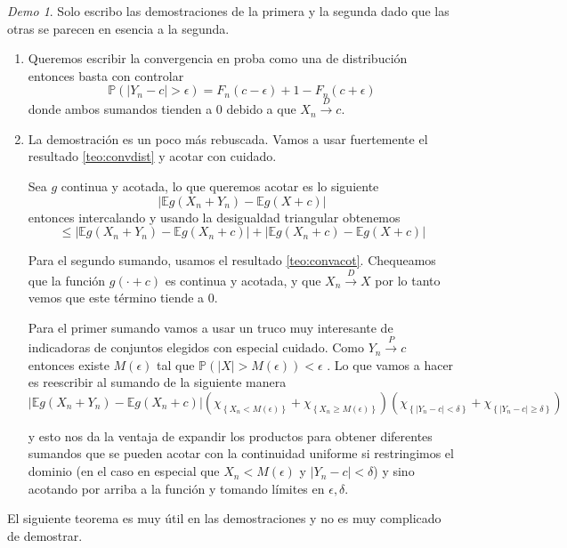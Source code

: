 \documentclass[11pt]{article}
\theoremstyle{plain} %
\theoremstyle{definition}
\theoremstyle{remark}
\newtheorem*{demo}{Demo}
\def\E{\mathbb{E}}
\def\P{\mathbb{P}}
\renewcommand\qed{\ding{110}}
\newcommand{\proba}{\overset{P}{\to}}
\newcommand{\dist}{\overset{D}{\to}}
\begin{document}
\begin{demo}
	Solo escribo las demostraciones de la primera y la segunda dado que las otras se parecen en esencia a la segunda.
	\begin{enumerate}
		\item Queremos escribir la convergencia en proba como una de distribución entonces basta con controlar 
		\[\P(\left| Y_n -c \right| > \epsilon ) = F_n(c - \epsilon) + 1 - F_n(c + \epsilon) \]
		donde ambos sumandos tienden a 0 debido a que $X_n \dist c$.
		
		\item La demostración es un poco más rebuscada. Vamos a usar fuertemente el resultado \ref{teo:convdist} y acotar con cuidado.
		
		Sea $g$ continua y acotada, lo que queremos acotar es lo siguiente
		\[ \left| \E  g(X_n + Y_n) - \E g(X + c)  \right| \]
		entonces intercalando y usando la desigualdad triangular obtenemos 
		\[ \leq \left| \E  g(X_n + Y_n) - \E g(X_n + c)  \right| + \left| \E  g(X_n + c) - \E g(X + c)  \right| \]
		
		Para el segundo sumando, usamos el resultado \ref{teo:convacot}. Chequeamos que la función $g(\cdot + c)$ es continua y acotada, y que $X_n \dist X$ por lo tanto vemos que este término tiende a 0.
		
		Para el primer sumando vamos a usar un truco muy interesante de indicadoras de conjuntos elegidos con especial cuidado. Como $Y_n \proba c$ entonces existe $M(\epsilon)$ tal que $\P\left( \left|X \right| > M(\epsilon) \right) < \epsilon  $ . Lo que vamos a hacer es reescribir al sumando de la siguiente manera
		\[ \left| \E  g(X_n + Y_n) - \E g(X_n + c)  \right| \left( \chi_{\left\lbrace X_n < M(\epsilon) \right\rbrace } + \chi_{\left\lbrace X_n \geq M(\epsilon) \right\rbrace } \right) \left( \chi_{\left\lbrace |Y_n - c| < \delta \right\rbrace } + \chi_{\left\lbrace |Y_n - c| \geq \delta \right\rbrace } \right) \]
		
		y esto nos da la ventaja de expandir los productos para obtener diferentes sumandos que se pueden acotar con la continuidad uniforme si restringimos el dominio (en el caso en especial que $X_n < M(\epsilon)$ y $|Y_n - c| < \delta $) y sino acotando por arriba a la función y tomando límites en $\epsilon, \delta$. \qed
		  
	\end{enumerate}
\end{demo}

El siguiente teorema es muy útil en las demostraciones y no es muy complicado de demostrar.
\end{document}
